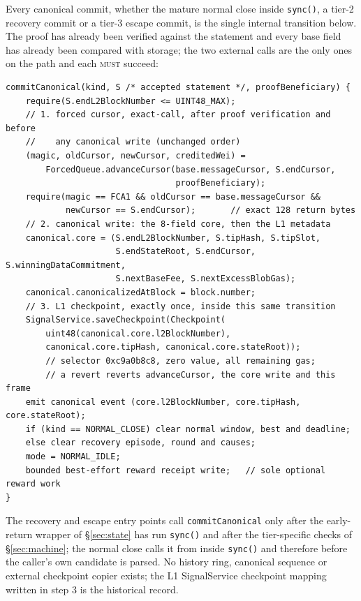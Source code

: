 \documentclass[a4paper,11pt]{article}
\newcommand{\code}[1]{\nolinkurl{#1}}
\newcommand{\must}{\textsc{must}}
\begin{document}
Every canonical commit, whether the mature normal close inside \code{sync()},
a tier-2 recovery commit or a tier-3 escape commit, is the single internal
transition below.  The proof has already been verified against the statement
and every base field has already been compared with storage; the two external
calls are the only ones on the path and each \must{} succeed:
\begin{verbatim}
commitCanonical(kind, S /* accepted statement */, proofBeneficiary) {
    require(S.endL2BlockNumber <= UINT48_MAX);
    // 1. forced cursor, exact-call, after proof verification and before
    //    any canonical write (unchanged order)
    (magic, oldCursor, newCursor, creditedWei) =
        ForcedQueue.advanceCursor(base.messageCursor, S.endCursor,
                                  proofBeneficiary);
    require(magic == FCA1 && oldCursor == base.messageCursor &&
            newCursor == S.endCursor);       // exact 128 return bytes
    // 2. canonical write: the 8-field core, then the L1 metadata
    canonical.core = (S.endL2BlockNumber, S.tipHash, S.tipSlot,
                      S.endStateRoot, S.endCursor, S.winningDataCommitment,
                      S.nextBaseFee, S.nextExcessBlobGas);
    canonical.canonicalizedAtBlock = block.number;
    // 3. L1 checkpoint, exactly once, inside this same transition
    SignalService.saveCheckpoint(Checkpoint(
        uint48(canonical.core.l2BlockNumber),
        canonical.core.tipHash, canonical.core.stateRoot));
        // selector 0xc9a0b8c8, zero value, all remaining gas;
        // a revert reverts advanceCursor, the core write and this frame
    emit canonical event (core.l2BlockNumber, core.tipHash, core.stateRoot);
    if (kind == NORMAL_CLOSE) clear normal window, best and deadline;
    else clear recovery episode, round and causes;
    mode = NORMAL_IDLE;
    bounded best-effort reward receipt write;   // sole optional reward work
}
\end{verbatim}
The recovery and escape entry points call \code{commitCanonical} only after
the early-return wrapper of \S\ref{sec:state} has run \code{sync()} and after
the tier-specific checks of \S\ref{sec:machine}; the normal close calls it
from inside \code{sync()} and therefore before the caller's own candidate is
parsed.  No history ring, canonical sequence or external checkpoint copier
exists; the L1 SignalService checkpoint mapping written in step 3 is the
historical record.
\end{document}
